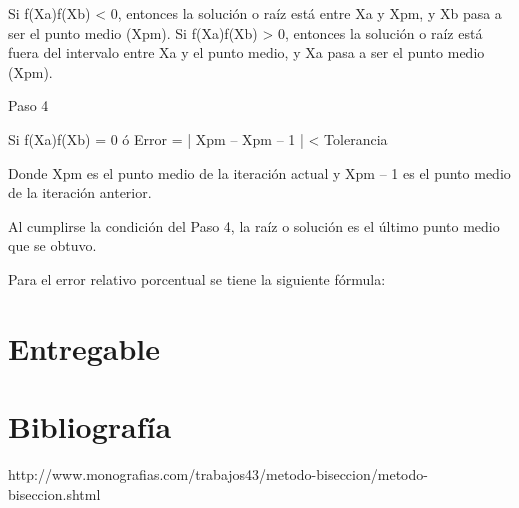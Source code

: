\documentclass[spanish,a4paper,10pt]{article}
\begin{document}
    Si f(Xa)f(Xb) < 0, entonces la solución o raíz está entre Xa y Xpm, y Xb pasa a ser el punto medio (Xpm).
    Si f(Xa)f(Xb) > 0, entonces la solución o raíz está fuera del intervalo entre Xa y el punto medio, y Xa pasa a ser el punto medio (Xpm).

 Paso 4

  Si f(Xa)f(Xb) = 0 ó Error = | Xpm – Xpm – 1 | < Tolerancia

  Donde Xpm es el punto medio de la iteración actual y Xpm – 1 es el punto medio de la iteración anterior.

  Al cumplirse la condición del Paso 4, la raíz o solución es el último punto medio que se obtuvo.

 Para el error relativo porcentual se tiene la siguiente fórmula:

\section{Entregable}


\section{Bibliografía}

\begin{thebibliography}{1}
 http://www.monografias.com/trabajos43/metodo-biseccion/metodo-biseccion.shtml
\end{thebibliography}
\end{document}
